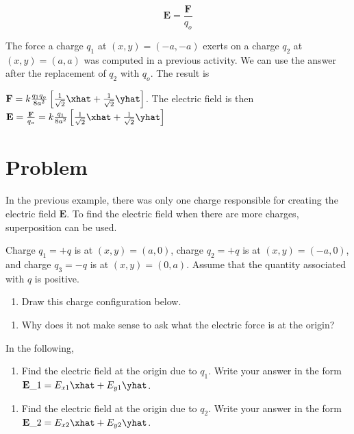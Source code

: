 \[\mathbf{E} = \frac{\mathbf{F}}{q_o}\]

The force a charge \(q_1\) at \((x,y)=(-a,-a)\) exerts on a charge
\(q_2\) at \((x,y)=(a,a)\) was computed in a previous activity. We can
use the answer after the replacement of \(q_2\) with \(q_o\). The result
is

\(\mathbf{F}=k\frac{q_1q_o}{8a^2}\left[\frac{1}{\sqrt{2}}\xhat + \frac{1}{\sqrt{2}}\yhat\right]\).
The electric field is then
\(\mathbf{E} = \frac{\mathbf{F}}{q_o} = k\frac{q_1}{8a^2}\left[\frac{1}{\sqrt{2}}\xhat + \frac{1}{\sqrt{2}}\yhat\right]\)

\newpage

\hypertarget{problem}{%
\section{Problem}\label{problem}}

In the previous example, there was only one charge responsible for
creating the electric field \(\mathbf{E}\). To find the electric field
when there are more charges, superposition can be used.

Charge \(q_1 = +q\) is at \((x, y) = (a, 0)\), charge \(q_2 = +q\) is at
\((x, y) = (-a, 0)\), and charge \(q_3 = -q\) is at \((x, y) = (0, a)\).
Assume that the quantity associated with \(q\) is positive.

\begin{enumerate}
\def\labelenumi{\arabic{enumi}.}
\tightlist
\item
  Draw this charge configuration below.
\end{enumerate}

\begin{enumerate}
\def\labelenumi{\arabic{enumi}.}
\setcounter{enumi}{1}
\tightlist
\item
  Why does it not make sense to ask what the electric force is at the
  origin?
\end{enumerate}

In the following,

\begin{enumerate}
\def\labelenumi{\arabic{enumi}.}
\setcounter{enumi}{2}
\tightlist
\item
  Find the electric field at the origin due to \(q_1\). Write your
  answer in the form \(\mathbf{E}\_1=E_{x1}\xhat + E_{y1}\yhat\).
\end{enumerate}

\begin{enumerate}
\def\labelenumi{\arabic{enumi}.}
\setcounter{enumi}{3}
\tightlist
\item
  Find the electric field at the origin due to \(q_2\). Write your
  answer in the form \(\mathbf{E}\_2=E_{x2}\xhat + E_{y2}\yhat\).
\end{enumerate}

